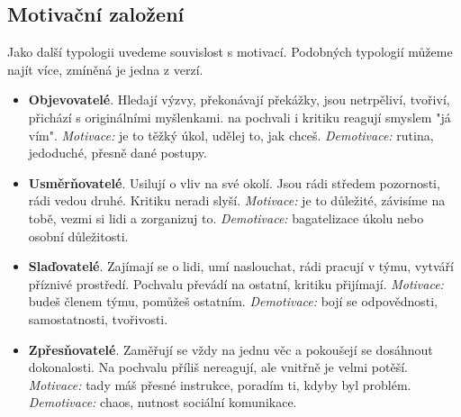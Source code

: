 \documentclass[a4paper,12pt]{report}
\begin{document}
\begin{samepage}
\subsection*{Motivační založení}
Jako další typologii uvedeme souvislost s motivací. Podobných typologií můžeme najít více, zmíněná je jedna z verzí.

\begin{itemize}
 \item \textbf{Objevovatelé}. Hledají výzvy, překonávají překážky, jsou netrpěliví, tvořiví, přichází s originálními myšlenkami. na pochvali i kritiku reagují smyslem "já vím". \newline
 \textit{Motivace:} je to těžký úkol, udělej to, jak chceš. \newline
 \textit{Demotivace:} rutina, jedoduché, přesně dané postupy.
 
 \item \textbf{Usměrňovatelé}. Usilují o vliv na své okolí. Jsou rádi středem pozornosti, rádi vedou druhé. Kritiku neradi slyší.\newline
 \textit{Motivace:} je to důležité, závisíme na tobě, vezmi si lidi a zorganizuj to.\newline
 \textit{Demotivace:} bagatelizace úkolu nebo osobní důležitosti.
 
 \item \textbf{Slaďovatelé}. Zajímají se o lidi, umí naslouchat, rádi pracují v týmu, vytváří příznivé prostředí. Pochvalu převádí na ostatní, kritiku přijímají.\newline
 \textit{Motivace:} budeš členem týmu, pomůžeš ostatním.\newline
 \textit{Demotivace:} bojí se odpovědnosti, samostatnosti, tvořivosti.
 
 \item \textbf{Zpřesňovatelé}. Zaměřují se vždy na jednu věc a pokoušejí se dosáhnout dokonalosti. Na pochvalu příliš nereagují, ale vnitřně je velmi potěší.\newline
 \textit{Motivace:} tady máš přesné instrukce, poradím ti, kdyby byl problém.\newline
 \textit{Demotivace:} chaos, nutnost sociální komunikace.
\end{itemize}
\end{samepage}
\end{document}

